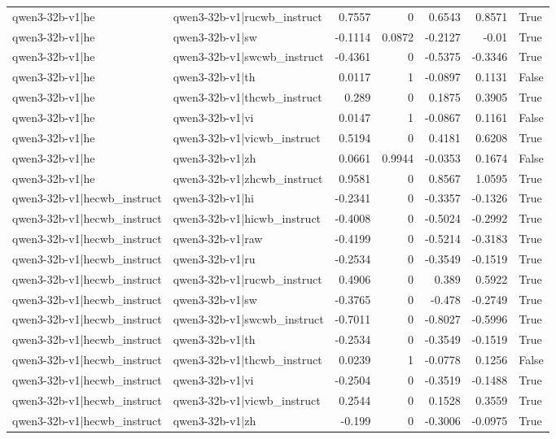 \begin{table}
\begin{tabular}{l l r r r r l}
qwen3-32b-v1|he & qwen3-32b-v1|rucwb_instruct & 0.7557 & 0 & 0.6543 & 0.8571 & True \\
qwen3-32b-v1|he & qwen3-32b-v1|sw & -0.1114 & 0.0872 & -0.2127 & -0.01 & True \\
qwen3-32b-v1|he & qwen3-32b-v1|swcwb_instruct & -0.4361 & 0 & -0.5375 & -0.3346 & True \\
qwen3-32b-v1|he & qwen3-32b-v1|th & 0.0117 & 1 & -0.0897 & 0.1131 & False \\
qwen3-32b-v1|he & qwen3-32b-v1|thcwb_instruct & 0.289 & 0 & 0.1875 & 0.3905 & True \\
qwen3-32b-v1|he & qwen3-32b-v1|vi & 0.0147 & 1 & -0.0867 & 0.1161 & False \\
qwen3-32b-v1|he & qwen3-32b-v1|vicwb_instruct & 0.5194 & 0 & 0.4181 & 0.6208 & True \\
qwen3-32b-v1|he & qwen3-32b-v1|zh & 0.0661 & 0.9944 & -0.0353 & 0.1674 & False \\
qwen3-32b-v1|he & qwen3-32b-v1|zhcwb_instruct & 0.9581 & 0 & 0.8567 & 1.0595 & True \\
qwen3-32b-v1|hecwb_instruct & qwen3-32b-v1|hi & -0.2341 & 0 & -0.3357 & -0.1326 & True \\
qwen3-32b-v1|hecwb_instruct & qwen3-32b-v1|hicwb_instruct & -0.4008 & 0 & -0.5024 & -0.2992 & True \\
qwen3-32b-v1|hecwb_instruct & qwen3-32b-v1|raw & -0.4199 & 0 & -0.5214 & -0.3183 & True \\
qwen3-32b-v1|hecwb_instruct & qwen3-32b-v1|ru & -0.2534 & 0 & -0.3549 & -0.1519 & True \\
qwen3-32b-v1|hecwb_instruct & qwen3-32b-v1|rucwb_instruct & 0.4906 & 0 & 0.389 & 0.5922 & True \\
qwen3-32b-v1|hecwb_instruct & qwen3-32b-v1|sw & -0.3765 & 0 & -0.478 & -0.2749 & True \\
qwen3-32b-v1|hecwb_instruct & qwen3-32b-v1|swcwb_instruct & -0.7011 & 0 & -0.8027 & -0.5996 & True \\
qwen3-32b-v1|hecwb_instruct & qwen3-32b-v1|th & -0.2534 & 0 & -0.3549 & -0.1519 & True \\
qwen3-32b-v1|hecwb_instruct & qwen3-32b-v1|thcwb_instruct & 0.0239 & 1 & -0.0778 & 0.1256 & False \\
qwen3-32b-v1|hecwb_instruct & qwen3-32b-v1|vi & -0.2504 & 0 & -0.3519 & -0.1488 & True \\
qwen3-32b-v1|hecwb_instruct & qwen3-32b-v1|vicwb_instruct & 0.2544 & 0 & 0.1528 & 0.3559 & True \\
qwen3-32b-v1|hecwb_instruct & qwen3-32b-v1|zh & -0.199 & 0 & -0.3006 & -0.0975 & True \\

\end{tabular}
\end{table}
